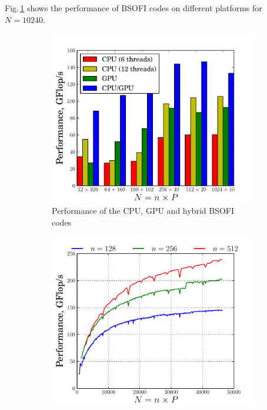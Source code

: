 \documentclass{llncs}
\begin{document}
Fig.\,\ref{fig:compare_BSOFTRI+BSOI} shows the performance of 
BSOFI codes on different platforms for $N=10240$.
\begin{figure}[t]%
  \centering

  \begin{subfigure}[t]{0.49\linewidth}
    \includegraphics[width=\textwidth]{./figs/pdf/BSOFI_BSOI_12}
    \caption{Performance of the CPU, GPU and hybrid BSOFI codes\label{fig:compare_BSOFTRI+BSOI}}
  \end{subfigure}
  \begin{subfigure}[t]{0.49\linewidth}
    \includegraphics[width=\textwidth]{./figs/pdf/BSOFTRI_BSOI}

\end{subfigure}
\end{figure}
\end{document}
